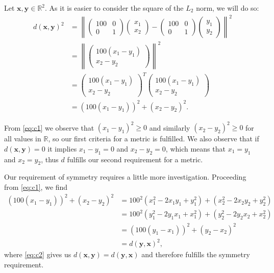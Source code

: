 \documentclass{article}
\newcommand{\vect}[1]{\ensuremath{\boldsymbol{\mathbf{#1}}}\xspace}
\begin{document}
Let $\vect{x}, \vect{y} \in \mathbb{R}^2$. As it is easier to consider
the square of the $L_2$ norm, we will do so:
\begin{align}
\nonumber  d(\vect{x},\vect{y})^2 &= \left\|\begin{pmatrix} 100 & 0\\ 0 & 1\end{pmatrix}\begin{pmatrix}x_1\\ x_2\end{pmatrix} - \begin{pmatrix}100 & 0\\ 0 & 1\end{pmatrix}\begin{pmatrix}y_1\\ y_2\end{pmatrix}\right\|^2 \\
      \nonumber &= \left\| \begin{pmatrix} 100(x_1 - y_1)\\ x_2 - y_2\end{pmatrix}\right\|^2\\
\nonumber          &= \begin{pmatrix} 100(x_1 - y_1)\\ x_2 - y_2\end{pmatrix}^T\begin{pmatrix} 100(x_1 - y_1)\\ x_2 - y_2\end{pmatrix}\\
            &= (100(x_1 - y_1))^2 + (x_2 - y_2)^2 \label{eq:c1}.
\end{align}

From \eqref{eq:c1} we observe that $(x_1 - y_1)^2 \geq 0$ and
similarly $(x_2 - y_2)^2 \geq 0$ for all values in $\mathbb{R}$, so
our first criteria for a metric is fulfilled. We also observe that if
$d(\vect{x},\vect{y}) = 0$ it implies $x_1 - y_1 = 0$ and $x_2 - y_2 =
0$, which means that $x_1 = y_1$ and $x_2 = y_2$, thus $d$ fulfills
our second requirement for a metric.

Our requirement of symmetry requires a little more
investigation. Proceeding from \eqref{eq:c1}, we find
\begin{align}
\nonumber (100(x_1 - y_1))^2 + (x_2 - y_2)^2 &= 100^2(x_1^2 - 2x_1y_1 + y_1^2) + (x_2^2 - 2x_2y_2 + y_2^2)\\
  \nonumber &= 100^2(y_1^2 - 2y_1x_1 + x_1^2) + (y_2^2 - 2y_2x_2 + x_2^2)\\
  \nonumber &= (100(y_1 - x_1))^2 + (y_2 - x_2)^2\\
  &= d(\vect{y},\vect{x})^2\label{eq:c2},
\end{align}
where \eqref{eq:c2} gives us $d(\vect{x},\vect{y}) =
d(\vect{y},\vect{x})$ and therefore fulfills the symmetry
requirement.
\end{document}
